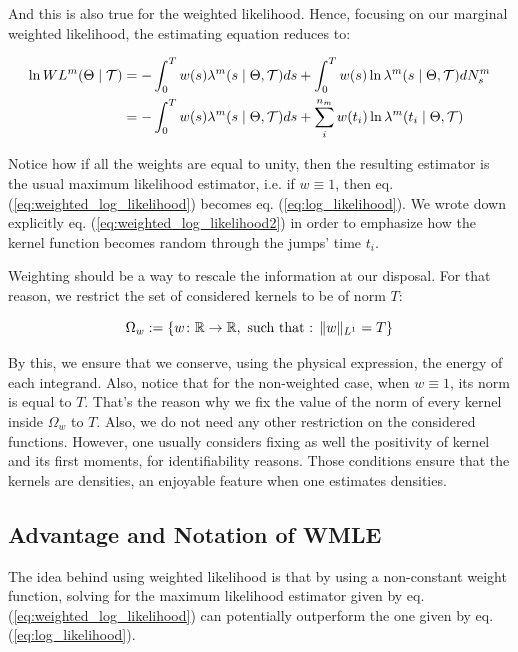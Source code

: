 \documentclass[11pt]{book}
\begin{document}
And this is also true for the weighted likelihood. Hence, focusing on our marginal weighted likelihood, the estimating equation reduces to:



\begin{align}
\ln W L^m( \Theta \mid \mathcal{T} ) &= - \int_0^T w(s) \lambda^{m} ( s \mid \Theta , \mathcal{T} ) ds + \int_0^T w(s) \ln \lambda^{m} ( s \mid \Theta , \mathcal{T} ) d N_s^m  
\label{eq:weighted_log_likelihood} \\
&=  - \int_0^T w(s) \lambda^{m} ( s \mid \Theta , \mathcal{T} )  ds +  \sum^{n_m}_i  w(t_i) \ln \lambda^{m} ( t_i \mid \Theta , \mathcal{T} )  \label{eq:weighted_log_likelihood2} 
\end{align}

Notice how if all the weights are equal to unity, then the resulting estimator is the usual maximum likelihood estimator, i.e. if $w \equiv 1$, then eq. (\ref{eq:weighted_log_likelihood}) becomes eq. (\ref{eq:log_likelihood}). We wrote down explicitly eq. (\ref{eq:weighted_log_likelihood2}) in order to emphasize how the kernel function becomes random through the jumps' time $t_i$. 

Weighting should be a way to rescale the information at our disposal. For that reason, we restrict the set of considered kernels to be of norm $T$:

$$\Omega_w := \{ w \colon \mathbb R \to \mathbb R, \text{ such that : } \lVert w\rVert_{L^1 } = T \} $$

By this, we ensure that we conserve, using the physical expression, the energy of each integrand. Also, notice that for the non-weighted case, when $w \equiv 1$, its norm is equal to $T$. That's the reason why we fix the value of the norm of every kernel inside $\Omega_w$ to $T$. Also, we do not need any other restriction on the considered functions. However, one usually considers fixing as well the positivity of kernel and its first moments, for identifiability reasons. Those conditions ensure that the kernels are densities, an enjoyable feature when one estimates densities. 

\subsection{Advantage and Notation of WMLE}

The idea behind using weighted likelihood is that by using a non-constant weight function, solving for the maximum likelihood estimator given by eq. (\ref{eq:weighted_log_likelihood}) can potentially outperform the one given by eq. (\ref{eq:log_likelihood}). 
\end{document}
